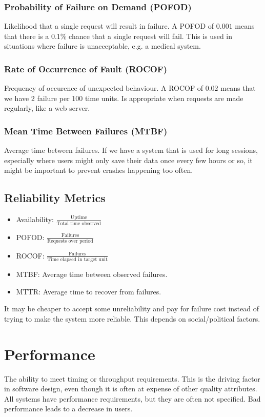 \subsubsection{Probability of Failure on Demand (POFOD)}
Likelihood that a single request will result in failure. A POFOD of $0.001$ means that there is a 0.1\% chance that a single request will fail. This is used in situations where failure is unacceptable, e.g. a medical system.

\subsubsection{Rate of Occurrence of Fault (ROCOF)}
Frequency of occurence of unexpected behaviour. A ROCOF of $0.02$ means that we have 2 failure per 100 time units. Is appropriate when requests are made regularly, like a web server.

\subsubsection{Mean Time Between Failures (MTBF)}
Average time between failures. If we have a system that is used for long sessions, especially where users might only save their data once every few hours or so, it might be important to prevent crashes happening too often.
\subsection{Reliability Metrics}
\begin{itemize}
	\item Availability: $\frac{\text{Uptime}}{\text{Total time observed}}$
	\item POFOD: $\frac{\text{Failures}}{\text{Requests over period}}$
	\item ROCOF: $\frac{\text{Failures}}{\text{Time elapsed in target unit}}$
	\item MTBF: Average time between observed failures.
	\item MTTR: Average time to recover from failures.
\end{itemize}
It may be cheaper to accept some unreliability and pay for failure cost instead of trying to make the system more reliable. This depends on social/political factors.

\section{Performance}
The ability to meet timing or throughput requirements. This is the driving factor in software design, even though it is often at expense of other quality attributes. All systems have performance requirements, but they are often not specified. Bad performance leads to a decrease in users.

